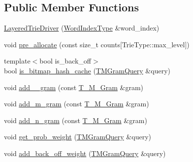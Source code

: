 \subsection*{Public Member Functions}
\begin{DoxyCompactItemize}
\item 
\hyperlink{classuva_1_1smt_1_1tries_1_1_layered_trie_driver_a3227c91c276b27e1b591a378b95de510}{Layered\+Trie\+Driver} (\hyperlink{classuva_1_1smt_1_1tries_1_1_layered_trie_driver_aaa30a8f51f4e610158fa8cf0eb965c01}{Word\+Index\+Type} \&word\+\_\+index)
\item 
void \hyperlink{classuva_1_1smt_1_1tries_1_1_layered_trie_driver_af1726a1b69e0274be8c9dfed9283b3ff}{pre\+\_\+allocate} (const size\+\_\+t counts\mbox{[}Trie\+Type\+::max\+\_\+level\mbox{]})
\item 
{\footnotesize template$<$bool is\+\_\+back\+\_\+off$>$ }\\bool \hyperlink{classuva_1_1smt_1_1tries_1_1_layered_trie_driver_a1db7700d2609beeae0dfb2a1f3cd5c3a}{is\+\_\+bitmap\+\_\+hash\+\_\+cache} (\hyperlink{classuva_1_1smt_1_1tries_1_1_layered_trie_driver_a260d262d60ecb64e33f39609e4dcfae9}{T\+M\+Gram\+Query} \&query)
\item 
void \hyperlink{classuva_1_1smt_1_1tries_1_1_layered_trie_driver_ade31d2fd4fa525d73f6431550c3ba3e6}{add\+\_\+\_\+gram} (const \hyperlink{structuva_1_1smt_1_1tries_1_1mgrams_1_1_t___m___gram}{T\+\_\+\+M\+\_\+\+Gram} \&gram)
\item 
void \hyperlink{classuva_1_1smt_1_1tries_1_1_layered_trie_driver_aa9dbc4a56665624d03be9071a7b576cb}{add\+\_\+m\+\_\+gram} (const \hyperlink{structuva_1_1smt_1_1tries_1_1mgrams_1_1_t___m___gram}{T\+\_\+\+M\+\_\+\+Gram} \&gram)
\item 
void \hyperlink{classuva_1_1smt_1_1tries_1_1_layered_trie_driver_aba8b64810a7a1b0dd89b129d42167446}{add\+\_\+n\+\_\+gram} (const \hyperlink{structuva_1_1smt_1_1tries_1_1mgrams_1_1_t___m___gram}{T\+\_\+\+M\+\_\+\+Gram} \&gram)
\item 
void \hyperlink{classuva_1_1smt_1_1tries_1_1_layered_trie_driver_a41b2c53ae4c5fedf84d629296b5718b8}{get\+\_\+prob\+\_\+weight} (\hyperlink{classuva_1_1smt_1_1tries_1_1_layered_trie_driver_a260d262d60ecb64e33f39609e4dcfae9}{T\+M\+Gram\+Query} \&query)
\item 
void \hyperlink{classuva_1_1smt_1_1tries_1_1_layered_trie_driver_ada9749d3e525c6cdf7121c7c224c4055}{add\+\_\+back\+\_\+off\+\_\+weight} (\hyperlink{classuva_1_1smt_1_1tries_1_1_layered_trie_driver_a260d262d60ecb64e33f39609e4dcfae9}{T\+M\+Gram\+Query} \&query)

\end{DoxyCompactItemize}
